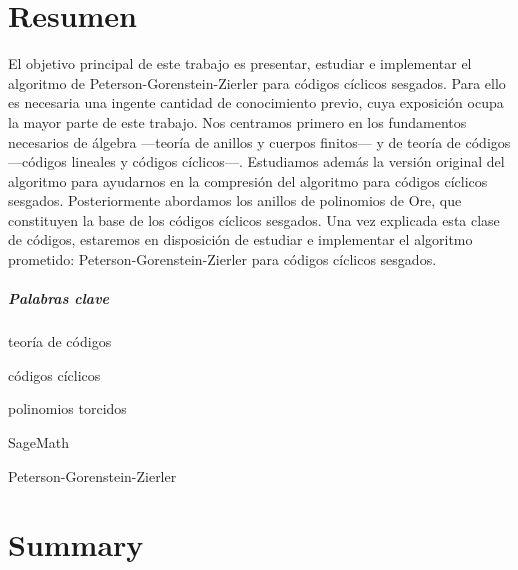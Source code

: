 \chapter*{Resumen}

El objetivo principal de este trabajo es presentar, estudiar e implementar el algoritmo de Peterson-Gorenstein-Zierler para códigos cíclicos sesgados.
Para ello es necesaria una ingente cantidad de conocimiento previo, cuya exposición ocupa la mayor parte de este trabajo.
Nos centramos primero en los fundamentos necesarios de álgebra —teoría de anillos y cuerpos finitos— y de teoría de códigos —códigos lineales y códigos cíclicos—.
Estudiamos además la versión original del algoritmo  para ayudarnos en la compresión del algoritmo para códigos cíclicos sesgados.
Posteriormente abordamos los anillos de polinomios de Ore, que constituyen la base de los códigos cíclicos sesgados.
Una vez explicada esta clase de códigos, estaremos en disposición de estudiar e implementar el algoritmo prometido: Peterson-Gorenstein-Zierler para códigos cíclicos sesgados.

\paragraph{Palabras clave}
\begin{itemize*}[label=,itemsep=4em,itemjoin=\hspace{2em}]
  \item teoría de códigos
  \item códigos cíclicos
  \item polinomios torcidos
  \item SageMath
  \item Peterson-Gorenstein-Zierler
\end{itemize*}

\chapter*{Summary}

